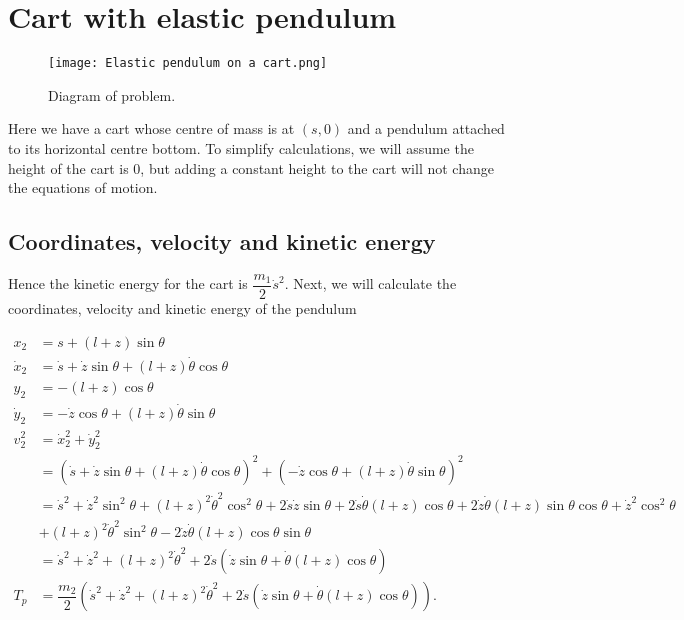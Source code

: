 \documentclass[12pt,a4paper,portrait]{article}
\begin{document}
\section{Cart with elastic pendulum}
\begin{figure}[H]
	\texttt{[image: Elastic pendulum on a cart.png]}
	\caption{Diagram of problem.}\label{fig1}
\end{figure}

Here we have a cart whose centre of mass is at $(s, 0)$ and a pendulum attached to its horizontal centre bottom. To simplify calculations, we will assume the height of the cart is 0, but adding a constant height to the cart will not change the equations of motion.

\subsection{Coordinates, velocity and kinetic energy}
Hence the kinetic energy for the cart is $\dfrac{m_1}{2}\dot{s}^2$. Next, we will calculate the coordinates, velocity and kinetic energy of the pendulum

\begin{align*}
	x_2 &= s + (l+z)\sin{\theta} \\
	\dot{x}_2 &= \dot{s} + \dot{z}\sin{\theta} + (l+z)\dot{\theta}\cos{\theta}\\
	y_2 &= -(l+z)\cos{\theta} \\
	\dot{y}_2 &= -\dot{z}\cos{\theta} + (l+z)\dot{\theta}\sin{\theta} \\
	v_2^2 &= \dot{x}_2^2 + \dot{y}_2^2 \\
	&= (\dot{s} + \dot{z}\sin{\theta} + (l+z)\dot{\theta}\cos{\theta})^2 + (-\dot{z}\cos{\theta} + (l+z)\dot{\theta}\sin{\theta})^2 \\
	&= \dot{s}^2 + \dot{z}^2 \sin^2{\theta} + (l+z)^2\dot{\theta}^2\cos^2{\theta} + 2\dot{s}\dot{z}\sin{\theta} + 2\dot{s}\dot{\theta}(l+z)\cos{\theta} + 2\dot{z}\dot{\theta}(l+z)\sin{\theta}\cos{\theta} + \dot{z}^2\cos^2{\theta} \\
	&+ (l+z)^2\dot{\theta}^2\sin^2{\theta} - 2\dot{z}\dot{\theta}(l+z)\cos{\theta}\sin{\theta}\\
	&= \dot{s}^2 + \dot{z}^2 + (l+z)^2\dot{\theta}^2 + 2\dot{s}(\dot{z}\sin{\theta} + \dot{\theta}(l+z)\cos{\theta})\\
	T_p &= \dfrac{m_2}{2} \left(\dot{s}^2 + \dot{z}^2 + (l+z)^2\dot{\theta}^2 + 2\dot{s}(\dot{z}\sin{\theta} + \dot{\theta}(l+z)\cos{\theta})\right).
\end{align*}
\end{document}
